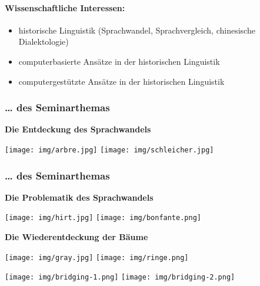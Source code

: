 \paragraph{Wissenschaftliche Interessen:}

\begin{itemize}
\itemsep1pt\parskip0pt
\item
  historische Linguistik (Sprachwandel, Sprachvergleich, chinesische
  Dialektologie)
\item
  computerbasierte Ansätze in der historischen Linguistik
\item
  computergestützte Ansätze in der historischen Linguistik
\end{itemize}

\pagebreak
\subsubsection{\texorpdfstring{{\ldots{} des
Seminarthemas}}{\ldots{} des Seminarthemas}}

\vspace{0.5cm}\par\noindent\textbf{Die Entdeckung des Sprachwandels}\vspace{0.5cm}

\texttt{[image: img/arbre.jpg]}
\texttt{[image: img/schleicher.jpg]}


\subsubsection{\texorpdfstring{{\ldots{} des
Seminarthemas}}{\ldots{} des Seminarthemas}}

\vspace{0.5cm}\par\noindent\textbf{Die Problematik des Sprachwandels}\vspace{0.5cm}

\texttt{[image: img/hirt.jpg]}
\texttt{[image: img/bonfante.png]}
\pagebreak


\vspace{0.5cm}\par\noindent\textbf{Die Wiederentdeckung der Bäume}\vspace{0.5cm}

\texttt{[image: img/gray.jpg]}
\texttt{[image: img/ringe.png]}

\texttt{[image: img/bridging-1.png]}
\texttt{[image: img/bridging-2.png]}

